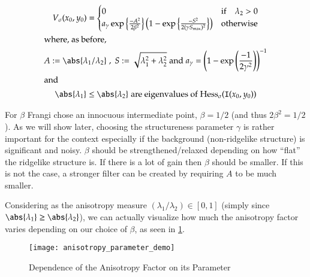     \begin{gather} \label{eq:frangi-vesselness-measure-v1}
    V_\sigma(x_0,y_0) = \begin{cases}
    0 & \text{if} \quad \lambda_2 > 0 \\
    a_\gamma \exp\left\{\frac{-A^2}{2\beta^2}\right\}
    \left(1 - \exp\left\{\frac{-S^2}{2(\gamma S_{\max})^2}\right\}\right) & \text{otherwise}
    \end{cases} \\
    \shortintertext{where, as before,}
    A := \abs{\lambda_1 / \lambda_2}
    \;,\;
    S := \sqrt{\lambda_1^2 + \lambda_2^2}
    \;\textrm{and}\;
    a_\gamma = \left(1-\exp\left(\frac{-1}{2\gamma^2}\right)\right)^{-1} \notag\\
    \shortintertext{and}
    \abs{\lambda_1} \le \abs{\lambda_2}
    \; \textrm{are eigenvalues of}\; \Hess_\sigma(\img(x_0, y_0)) \notag
    \end{gather}
    
    For $\beta$ Frangi chose an innocuous intermediate point, $\beta=1/2$ (and thus $2\beta^2 = 1/2$).
    As we will show later, choosing the structureness parameter $\gamma$ is rather important for the context especially if the background (non-ridgelike structure) is significant and noisy. $\beta$ should be strengthened/relaxed depending on how ``flat'' the ridgelike structure is. If there is a lot of gain then $\beta$ should be smaller. If this is not the case, a stronger filter can be created by requiring $A$ to be much smaller.
    
    Considering as the anisotropy measure $(\lambda_1 / \lambda_2) \in [0,1]$ (simply since $\abs{\lambda_1} \ge \abs{\lambda_2}$), we can actually visualize how much the 
    anisotropy factor varies depending on our choice of $\beta$, as seen in \cref{fig:anisotropy-parameter-demo}.
    
    \begin{figure}
      \texttt{[image: anisotropy\_parameter\_demo]}
      \caption{Dependence of the Anisotropy Factor on its Parameter}
      \label{fig:anisotropy-parameter-demo}
    \end{figure}

